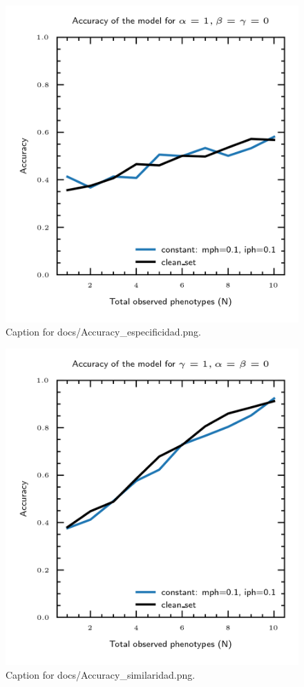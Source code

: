 \documentclass{article}
\begin{document}
\begin{figure}[h] \centering \includegraphics{docs/Accuracy_especificidad.png} \caption{Caption for docs/Accuracy_especificidad.png.} \end{figure}
\begin{figure}[h] \centering \includegraphics{docs/Accuracy_similaridad.png} \caption{Caption for docs/Accuracy_similaridad.png.} \end{figure}
\end{document}
